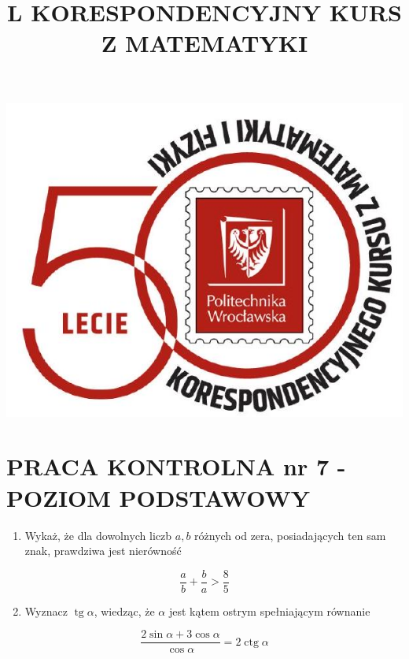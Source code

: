 \documentclass[10pt]{article}
\title{L KORESPONDENCYJNY KURS Z MATEMATYKI }
\author{}
\date{}
\begin{document}
\maketitle
\begin{center}
\includegraphics[max width=\textwidth]{2024_11_16_1a99b322ab5d472fd413g-1}
\end{center}

\section*{PRACA KONTROLNA nr 7 - POZIOM PODSTAWOWY}
\begin{enumerate}
  \item Wykaż, że dla dowolnych liczb $a, b$ różnych od zera, posiadających ten sam znak, prawdziwa jest nierówność
\end{enumerate}

$$
\frac{a}{b}+\frac{b}{a}>\frac{8}{5}
$$

\begin{enumerate}
  \setcounter{enumi}{1}
  \item Wyznacz $\operatorname{tg} \alpha$, wiedząc, że $\alpha$ jest kątem ostrym spełniającym równanie
\end{enumerate}

$$
\frac{2 \sin \alpha+3 \cos \alpha}{\cos \alpha}=2 \operatorname{ctg} \alpha
$$
\end{document}
